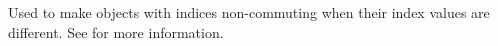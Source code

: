 
Used to make objects with indices non-commuting when their index
values are different. See  for more
information.

